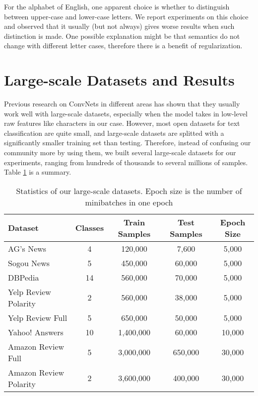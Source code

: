 \documentclass{article} \usepackage{nips15submit_e,times}
\newenvironment{centerverbatim}{\par
  \centering
  \varwidth{\linewidth}\verbatim
}{\endverbatim
  \endvarwidth
  \par
}
\begin{document}
\begin{centerverbatim}
For the alphabet of English, one apparent choice is whether to distinguish between upper-case and lower-case letters. We report experiments on this choice and observed that it usually (but not always) gives worse results when such distinction is made. One possible explanation might be that semantics do not change with different letter cases, therefore there is a benefit of regularization.

\section{Large-scale Datasets and Results}

Previous research on ConvNets in different areas has shown that they usually work well with large-scale datasets, especially when the model takes in low-level raw features like characters in our case. However, most open datasets for text classification are quite small, and large-scale datasets are splitted with a significantly smaller training set than testing\cite{LYRL04}. Therefore, instead of confusing our community more by using them, we built several large-scale datasets for our experiments, ranging from hundreds of thousands to several millions of samples. Table \ref{tab:data} is a summary.

\begin{table}[ht]
  \caption{Statistics of our large-scale datasets. Epoch size is the number of minibatches in one epoch}
  \label{tab:data}
  \begin{center}
    \begin{tabular}{lcccc}
      Dataset & Classes & Train Samples & Test Samples & Epoch Size \\
      \hline
      AG's News & 4 & 120,000 & 7,600 & 5,000 \\
      Sogou News & 5 & 450,000 & 60,000 & 5,000 \\
      DBPedia & 14 & 560,000 & 70,000 & 5,000 \\
      Yelp Review Polarity & 2 & 560,000 & 38,000 & 5,000 \\
      Yelp Review Full & 5 & 650,000 & 50,000 & 5,000 \\
      Yahoo! Answers & 10 & 1,400,000 & 60,000 & 10,000 \\
      Amazon Review Full & 5 & 3,000,000 & 650,000 & 30,000 \\
      Amazon Review Polarity & 2 & 3,600,000 & 400,000 & 30,000 \\
    \end{tabular}
  \end{center}
\end{table}


\end{centerverbatim}
\end{document}

